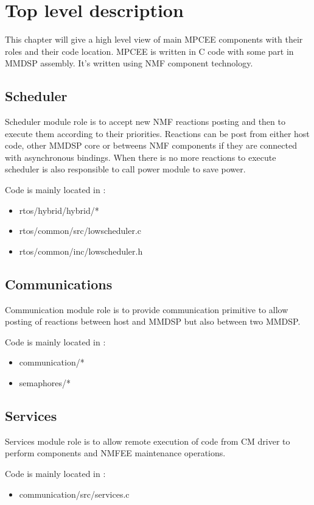 \chapter{Top level description}
This chapter will give a high level view of main MPCEE components with their
roles and their code location. MPCEE is written in C code with some part in
MMDSP assembly. It's written using NMF component technology.
\section{Scheduler}
Scheduler module role is to accept new NMF reactions posting and then to
execute them according to their priorities. Reactions can be post from either host code,
other MMDSP core or betweens NMF components if they are connected with
asynchronous bindings. When there is no more reactions to execute scheduler is
also responsible to call power module to save power.

Code is mainly located in :
\begin{itemize}
  \item rtos/hybrid/hybrid/*
  \item rtos/common/src/lowscheduler.c
  \item rtos/common/inc/lowscheduler.h
\end{itemize}

\section{Communications}
Communication module role is to provide communication primitive to allow posting
of reactions between host and MMDSP but also between two MMDSP.

Code is mainly located in :
\begin{itemize}
  \item communication/*
  \item semaphores/*
\end{itemize}

\section{Services}
Services module role is to allow remote execution of code from CM driver to
perform components and NMFEE maintenance operations.

Code is mainly located in :
\begin{itemize}
  \item communication/src/services.c
\end{itemize}

